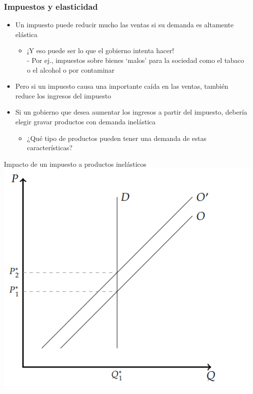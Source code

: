 \documentclass{beamer}
\begin{document}
\begin{frame}
\frametitle{Impuestos y elasticidad}
\begin{itemize}
    \item Un impuesto puede reducir mucho las ventas si su demanda es altamente elástica
    \begin{itemize}
        \item ¡Y eso puede ser lo que el gobierno intenta hacer! \\
        - Por ej., impuestos sobre bienes ‘malos’ para la sociedad como el tabaco o el alcohol o por contaminar
    \end{itemize}
    \item Pero si un impuesto causa una importante caída en las ventas, también reduce los ingresos del impuesto
    \item Si un gobierno que desea aumentar los ingresos a partir del impuesto, debería elegir gravar productos con demanda inelástica
    \begin{itemize}
        \item ¿Qué tipo de productos pueden tener una demanda de estas características?
    \end{itemize}
\end{itemize}
\end{frame}

\begin{frame}{Impacto de un impuesto a productos inelásticos}
    \centering
    \includegraphics[scale=0.7]{../Figures/C24.3.png}
\end{frame}
\end{document}
